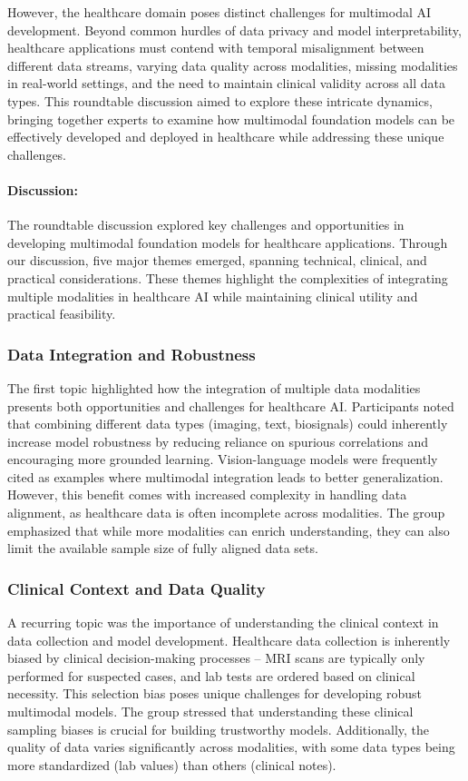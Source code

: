 However, the healthcare domain poses distinct challenges for multimodal AI development. Beyond common hurdles of data privacy and model interpretability, healthcare applications must contend with temporal misalignment between different data streams, varying data quality across modalities, missing modalities in real-world settings, and the need to maintain clinical validity across all data types. This roundtable discussion aimed to explore these intricate dynamics, bringing together experts to examine how multimodal foundation models can be effectively developed and deployed in healthcare while addressing these unique challenges.

\paragraph{Discussion:}
The roundtable discussion explored key challenges and opportunities in developing multimodal foundation models for healthcare applications. Through our discussion, five major themes emerged, spanning technical, clinical, and practical considerations. These themes highlight the complexities of integrating multiple modalities in healthcare AI while maintaining clinical utility and practical feasibility. 

\subsubsection{Data Integration and Robustness}
The first topic highlighted how the integration of multiple data modalities presents both opportunities and challenges for healthcare AI. Participants noted that combining different data types (imaging, text, biosignals) could inherently increase model robustness by reducing reliance on spurious correlations and encouraging more grounded learning. Vision-language models were frequently cited as examples where multimodal integration leads to better generalization. However, this benefit comes with increased complexity in handling data alignment, as healthcare data is often incomplete across modalities. The group emphasized that while more modalities can enrich understanding, they can also limit the available sample size of fully aligned data sets.

\subsubsection{Clinical Context and Data Quality}
A recurring topic was the importance of understanding the clinical context in data collection and model development. Healthcare data collection is inherently biased by clinical decision-making processes – MRI scans are typically only performed for suspected cases, and lab tests are ordered based on clinical necessity. This selection bias poses unique challenges for developing robust multimodal models. The group stressed that understanding these clinical sampling biases is crucial for building trustworthy models. Additionally, the quality of data varies significantly across modalities, with some data types being more standardized (lab values) than others (clinical notes).

